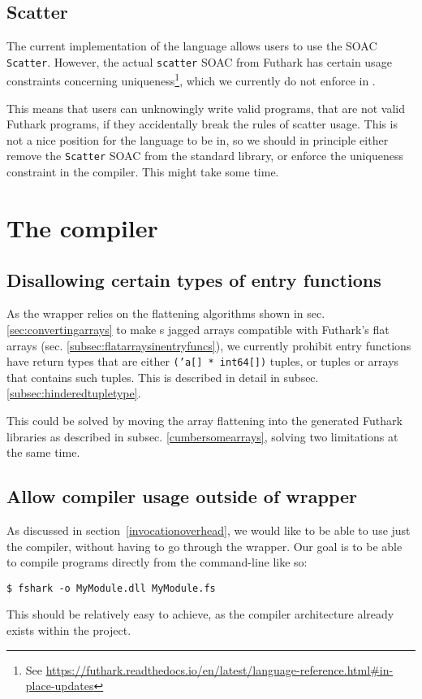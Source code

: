 \subsection{Scatter}
\label{subsec:badscatter}
The current implementation of the \fshark{} language allows users to use the
SOAC \texttt{Scatter}. However, the actual \texttt{scatter} SOAC from Futhark
has certain usage constraints concerning uniqueness\footnote{See \url{https://futhark.readthedocs.io/en/latest/language-reference.html#in-place-updates}}, which we currently do not enforce
in \fshark{}.

This means that users can unknowingly write valid \fshark{} programs, that are
not valid Futhark programs, if they accidentally break the rules of scatter
usage. This is not a nice position for the \fshark{} language to be in, so we
should in principle either remove the \texttt{Scatter} SOAC from the \fshark{} standard
library, or enforce the uniqueness constraint in the \fshark{} compiler.
This might take some time.

\section{The \fshark{} compiler}

\subsection{Disallowing certain types of \fshark{} entry functions}
As the \fshark{} wrapper relies on the flattening algorithms shown in sec.
\ref{sec:convertingarrays} to make \fsharp{}s jagged arrays compatible with
Futhark's flat arrays (sec. \ref{subsec:flatarraysinentryfuncs}), we currently
prohibit \fshark{} entry functions have return types that are either
\texttt{('a[] * int64[])} tuples, or tuples or arrays that contains such
tuples. This is described in detail in subsec. \ref{subsec:hinderedtupletype}.

This could be solved by moving the array flattening into the generated Futhark
\csharp{} libraries as described in subsec. \ref{cumbersomearrays}, solving two
limitations at the same time.

\subsection{Allow compiler usage outside of \fshark{} wrapper}
As discussed in section~\ref{invocationoverhead}, we would like to be able to use just the \fshark{}
compiler, without having to go through the \fshark{} wrapper.
Our goal is to be able to compile \fshark{} programs directly from the
command-line like so:
\begin{verbatim}
$ fshark -o MyModule.dll MyModule.fs
\end{verbatim}
This should be relatively easy to achieve, as the compiler architecture already
exists within the \fshark{} project.

